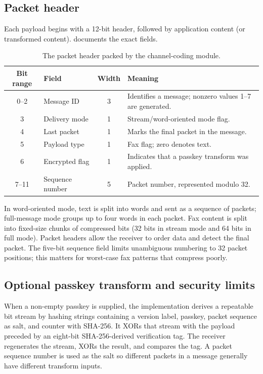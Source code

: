 \documentclass[11pt,a4paper]{article}
\begin{document}
\subsection{Packet header}
Each payload begins with a 12-bit header, followed by application content (or transformed content).  documents the exact fields.

\begin{table}[ht]
\centering
\begin{tabular}{@{}clcl@{}}
\toprule
\textbf{Bit range} & \textbf{Field} & \textbf{Width} & \textbf{Meaning} \\
\midrule
0--2 & Message ID & 3 & Identifies a message; nonzero values 1--7 are generated. \\
3 & Delivery mode & 1 & Stream/word-oriented mode flag. \\
4 & Last packet & 1 & Marks the final packet in the message. \\
5 & Payload type & 1 & Fax flag; zero denotes text. \\
6 & Encrypted flag & 1 & Indicates that a passkey transform was applied. \\
7--11 & Sequence number & 5 & Packet number, represented modulo 32. \\
\bottomrule
\end{tabular}
\caption{The packet header packed by the channel-coding module.}
\label{tab:header}
\end{table}

In word-oriented mode, text is split into words and sent as a sequence of packets; full-message mode groups up to four words in each packet. Fax content is split into fixed-size chunks of compressed bits (32 bits in stream mode and 64 bits in full mode). Packet headers allow the receiver to order data and detect the final packet. The five-bit sequence field limits unambiguous numbering to 32 packet positions; this matters for worst-case fax patterns that compress poorly.

\subsection{Optional passkey transform and security limits}
When a non-empty passkey is supplied, the implementation derives a repeatable bit stream by hashing strings containing a version label, passkey, packet sequence as salt, and counter with SHA-256. It XORs that stream with the payload preceded by an eight-bit SHA-256-derived verification tag. The receiver regenerates the stream, XORs the result, and compares the tag. A packet sequence number is used as the salt so different packets in a message generally have different transform inputs.
\end{document}
